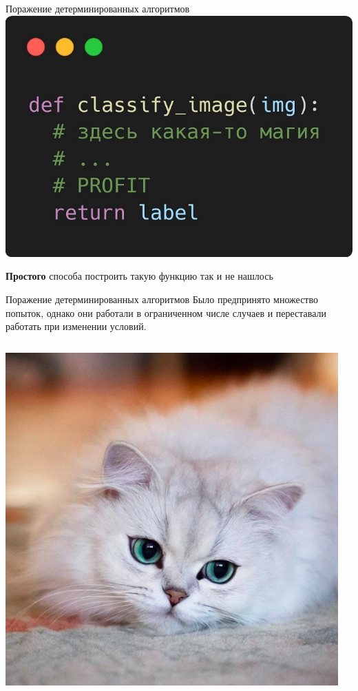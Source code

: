\documentclass[aspectratio=169, professionalfonts]{beamer}
\begin{document}
\begin{frame}{Поражение детерминированных алгоритмов}
    \centering
    \includegraphics[width=.5\linewidth]{figures/fig9-clf-function.jpg}

    \textbf{Простого} способа построить такую функцию так и не нашлось
\end{frame}

\begin{frame}{Поражение детерминированных алгоритмов}
    Было предпринято множество попыток, однако они работали в ограниченном
    числе случаев и переставали работать при изменении условий.
    \vfill
    \begin{columns}
        \begin{column}{.25\linewidth}
            \includegraphics[width=\linewidth]{figures/fig7-cat.jpg}
        \end{column}
        \begin{column}{.15\linewidth}

\end{column}
\end{columns}
\end{frame}
\end{document}
